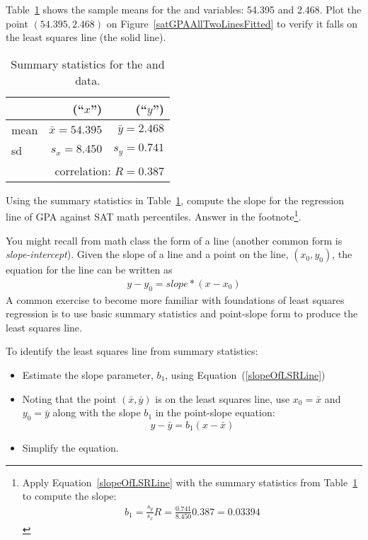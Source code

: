 \begin{exercise}
Table~\ref{summaryStatsOfSATGPAData} shows the sample means for the  and  variables: 54.395 and 2.468. Plot the point $(54.395, 2.468)$ on Figure~\vref{satGPAAllTwoLinesFitted} to verify it falls on the least squares line (the solid line).
\end{exercise}
\begin{table}[ht]
\centering
\begin{tabular}{l rr}
\hline
	&	\var{satMath} (``$x$'')	& \var{GPA} (``$y$'') \\
\hline
mean	& $\bar{x} = 54.395$		& $\bar{y} = 2.468$ \\
sd		& $s_x = 8.450$		& $s_y = 0.741$ \\
\hline
	& \multicolumn{2}{r}{correlation: $R=0.387$} \\
\hline
\end{tabular}
\caption{Summary statistics for the  and  data.}
\label{summaryStatsOfSATGPAData}
\end{table}

\begin{exercise} \label{findingTheSlopeOfTheLSRLineForSATMathAndGPA}
Using the summary statistics in Table~\ref{summaryStatsOfSATGPAData}, compute the slope for the regression line of GPA against SAT math percentiles. Answer in the footnote\footnote{Apply Equation~\eqref{slopeOfLSRLine} with the summary statistics from Table~\ref{summaryStatsOfSATGPAData} to compute the slope:
\begin{eqnarray*}
b_1 = \frac{s_y}{s_x} R = \frac{0.741}{8.450}0.387 = 0.03394
\end{eqnarray*}}.
\end{exercise}

You might recall from math class the  form of a line (another common form is \emph{slope-intercept}). Given the slope of a line and a point on the line, $(x_0, y_0)$, the equation for the line can be written as
\begin{eqnarray}
y - y_0 = slope*(x - x_0)
\label{pointSlopeFormForALine}
\end{eqnarray}
A common exercise to become more familiar with foundations of least squares regression is to use basic summary statistics and point-slope form to produce the least squares line. 

\begin{tipBox}{
To identify the least squares line from summary statistics:
\begin{itemize}
\item Estimate the slope parameter, $b_1$, using Equation~(\ref{slopeOfLSRLine})
\item Noting that the point $(\bar{x}, \bar{y})$ is on the least squares line, use $x_0=\bar{x}$ and $y_0=\bar{y}$ along with the slope $b_1$ in the point-slope equation:
$$y - \bar{y} = b_1 (x - \bar{x}) $$
\item Simplify the equation.
\end{itemize}}
\end{tipBox}

